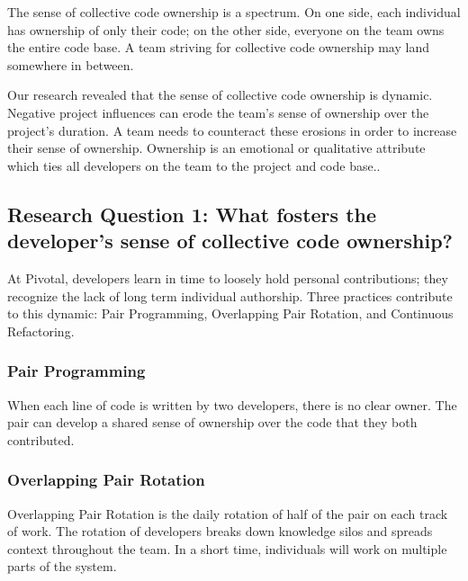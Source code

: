 The sense of collective code ownership is a spectrum. On one side, each individual has ownership of only their code;  on the other side, everyone on the team owns the entire code base. A team striving for collective code ownership may land somewhere in between. 

Our research revealed that the sense of collective code ownership is dynamic. Negative project influences can erode the team's sense of ownership over the project's duration. A team needs to counteract these erosions in order to increase their sense of ownership. Ownership is an emotional or qualitative attribute which ties all developers on the team to the project and code base..


\subsection{Research Question 1: What fosters the developer's sense of collective code ownership?}
At Pivotal, developers learn in time to loosely hold personal contributions; they recognize the lack of long term individual authorship. Three practices contribute to this dynamic: Pair Programming, Overlapping Pair Rotation, and Continuous Refactoring.

\subsubsection{Pair Programming}
When each line of code is written by two developers, there is no clear owner. The pair can develop a shared sense of ownership over the code that they both contributed.

\subsubsection{Overlapping Pair Rotation}
Overlapping Pair Rotation is the daily rotation of half of the pair on each track of work. The rotation of developers breaks down knowledge silos and spreads context throughout the team. In a short time, individuals will work on multiple parts of the system. 

